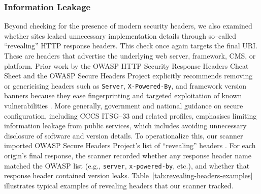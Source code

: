 \documentclass[pdflatex,sn-mathphys-num]{sn-jnl}
\numberwithin{equation}{section}
\theoremstyle{thmstyleone}
\theoremstyle{thmstyletwo}%
\theoremstyle{thmstylethree}%
\begin{document}
\subsubsection{Information Leakage}

\vspace{1em}Beyond checking for the presence of modern security headers, we also examined whether sites leaked 
unnecessary implementation details through so--called 
``revealing'' HTTP response headers. This check once again targets the final URI. 
These are headers that advertise the underlying web server, framework, CMS, or platform. Prior work by the OWASP 
HTTP Security Response Headers
Cheat Sheet and the OWASP Secure Headers Project explicitly recommends removing or genericising headers such as 
\texttt{Server}, \texttt{X-Powered-By}, 
and framework version banners because they ease fingerprinting and targeted exploitation of known vulnerabilities 
\cite{owasp_secure_headers_project, owasp_http_security_response_headers}. 
More generally, government and national guidance on secure configuration, including CCCS ITSG--33 and related profiles, emphasises limiting information leakage from public services, 
which includes avoiding unnecessary disclosure of software and version details. To operationalize this, our scanner 
imported OWASP Secure Headers Project's list of ``revealing'' headers \cite{owasp_secure_headers_remove_json}. 
For each origin's final response, the scanner recorded whether any response header name matched the OWASP list 
(e.g., \texttt{server}, \texttt{x-powered-by}, etc.), and whether that response header contained version leaks. Table~\ref{tab:revealing-headers-examples} 
illustrates typical examples of revealing headers that our scanner tracked.

\end{document}
